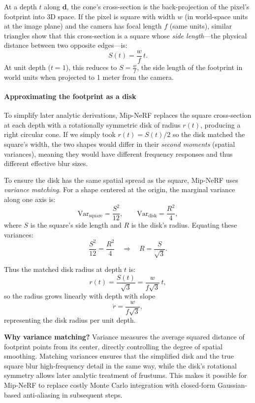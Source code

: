 \begin{enrichment}
\begin{enrichment}
    At a depth \(t\) along \(\mathbf{d}\), the cone’s cross-section is the back-projection of the pixel’s footprint into 3D space.  
    If the pixel is square with width \(w\) (in world-space units at the image plane) and the camera has focal length \(f\) (same units), similar triangles show that this cross-section is a square whose \emph{side length}—the physical distance between two opposite edges—is:
    \[
    S(t) = \frac{w}{f} \, t.
    \]
    At unit depth (\(t=1\)), this reduces to \(S = \frac{w}{f}\), the side length of the footprint in world units when projected to 1 meter from the camera.
    
    \paragraph{Approximating the footprint as a disk}  
    To simplify later analytic derivations, Mip-NeRF replaces the square cross-section at each depth with a rotationally symmetric disk of radius \(r(t)\), producing a right circular cone.  
    If we simply took \(r(t) = S(t)/2\) so the disk matched the square’s width, the two shapes would differ in their \emph{second moments} (spatial variances), meaning they would have different frequency responses and thus different effective blur sizes.
    
    To ensure the disk has the same spatial spread as the square, Mip-NeRF uses \emph{variance matching}.  
    For a shape centered at the origin, the marginal variance along one axis is:
    \[
    \mathrm{Var}_{\text{square}} = \frac{S^2}{12},
    \qquad
    \mathrm{Var}_{\text{disk}} = \frac{R^2}{4},
    \]
    where \(S\) is the square’s side length and \(R\) is the disk’s radius.  
    Equating these variances:
    \[
    \frac{S^2}{12} = \frac{R^2}{4} 
    \quad\Rightarrow\quad R = \frac{S}{\sqrt{3}}.
    \]
    
    Thus the matched disk radius at depth \(t\) is:
    \[
    r(t) = \frac{S(t)}{\sqrt{3}} = \frac{w}{f \sqrt{3}} \, t,
    \]
    so the radius grows linearly with depth with slope
    \[
    \dot{r} = \frac{w}{f\sqrt{3}},
    \]
    representing the disk radius per unit depth.
    
    \textbf{Why variance matching?}  
    Variance measures the average squared distance of footprint points from its center, directly controlling the degree of spatial smoothing.  
    Matching variances ensures that the simplified disk and the true square blur high-frequency detail in the same way, while the disk’s rotational symmetry allows later analytic treatment of frustums.  
    This makes it possible for Mip-NeRF to replace costly Monte Carlo integration with closed-form Gaussian-based anti-aliasing in subsequent steps.
    

\end{enrichment}
\end{enrichment}
